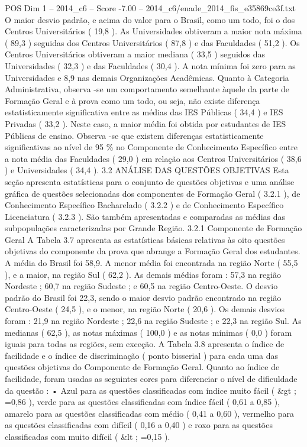 \begin{textsample}{POS Dim 1 – 2014\_c6 – Score -7.00 – 2014\_c6/enade\_2014\_fis\_e35869ce3f.txt}
O maior desvio padrão, e acima do valor para o Brasil, como um todo, foi o dos Centros Universitários ( 19,8 ).
As Universidades obtiveram a maior nota máxima ( 89,3 ) seguidas dos Centros Universitários ( 87,8 ) e das Faculdades ( 51,2 ).
Os Centros Universitários obtiveram a maior mediana ( 33,5 ) seguidos das Universidades ( 32,3 ) e das Faculdades ( 30,4 ).
A nota mínima foi zero para as Universidades e 8,9 nas demais Organizações Acadêmicas.
Quanto à Categoria Administrativa, observa -se um comportamento semelhante àquele da parte de Formação Geral e à prova como um todo, ou seja, não existe diferença estatisticamente significativa entre as médias das IES Públicas ( 34,4 ) e IES Privadas ( 33,2 ).
Neste caso, a maior média foi obtida por estudantes de IES Públicas de ensino.
Observa -se que existem diferenças estatisticamente significativas ao nível de 95 \% no Componente de Conhecimento Específico entre a nota média das Faculdades ( 29,0 ) em relação aos Centros Universitários ( 38,6 ) e Universidades ( 34,4 ). 3.2 ANÁLISE DAS QUESTÕES OBJETIVAS Esta seção apresenta estatísticas para o conjunto de questões objetivas e uma análise gráfica de questões selecionadas dos componentes de Formação Geral ( 3.2.1 ), de Conhecimento Específico Bacharelado ( 3.2.2 ) e de Conhecimento Específico Licenciatura ( 3.2.3 ).
São também apresentadas e comparadas as médias das subpopulações caracterizadas por Grande Região. 3.2.1 Componente de Formação Geral A Tabela 3.7 apresenta as estatísticas básicas relativas às oito questões objetivas do componente da prova que abrange a Formação Geral dos estudantes.
A média do Brasil foi 58,9.
A menor média foi encontrada na região Norte ( 55,5 ), e a maior, na região Sul ( 62,2 ).
As demais médias foram : 57,3 na região Nordeste ; 60,7 na região Sudeste ; e 60,5 na região Centro-Oeste.
O desvio padrão do Brasil foi 22,3, sendo o maior desvio padrão encontrado na região Centro-Oeste ( 24,5 ), e o menor, na região Norte ( 20,6 ).
Os demais desvios foram : 21,9 na região Nordeste ; 22,6 na região Sudeste ; e 22,3 na região Sul.
As medianas ( 62,5 ), as notas máximas ( 100,0 ) e as notas mínimas ( 0,0 ) foram iguais para todas as regiões, sem exceção.
A Tabela 3.8 apresenta o índice de facilidade e o índice de discriminação ( ponto bisserial ) para cada uma das questões objetivas do Componente de Formação Geral.
Quanto ao índice de facilidade, foram usadas as seguintes cores para diferenciar o nível de dificuldade da questão : • Azul para as questões classificadas com índice muito fácil ( \&gt ; =0,86 ), verde para as questões classificadas com índice fácil ( 0,61 a 0,85 ), amarelo para as questões classificadas com médio ( 0,41 a 0,60 ), vermelho para as questões classificadas com difícil ( 0,16 a 0,40 ) e roxo para as questões classificadas com muito difícil ( \&lt ; =0,15 ).

\end{textsample}
